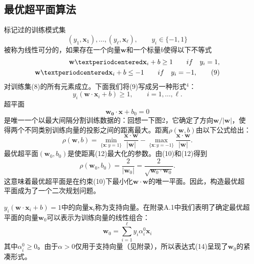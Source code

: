\documentclass[lang=cn,11pt,a4paper]{elegantpaper}
\begin{document}
	\subsection{最优超平面算法}
	标记过的训练模式集
	\begin{equation}
		(y_1,\mathbf{x}_1),\ldots,(y_\ell,\mathbf{x}_\ell),\qquad y_i\in\{-1,1\}\tag{8}
	\end{equation}
	被称为线性可分的，如果存在一个向量$\mathbf{w}$和一个标量$b$使得以下不等式
	\begin{align}
		\mathbf{w}·\mathbf{x}_i+b\geq1\qquad if\quad y_i=1,\notag \\
		\mathbf{w}·\mathbf{x}_i+b\leq-1\qquad if\quad y_i=-1,\tag{9}
	\end{align}
	对训练集(8)的所有元素成立。下面我们将(9)写成另一种形式$^4$：
	\begin{equation}
		y_i(\mathbf{w}·\mathbf{x}_i+b)\geq1,\qquad i=1,\ldots,\ell.\tag{10}
	\end{equation}
	超平面
	\begin{equation}
		\mathbf{w_0·x}+b_0=0\tag{11}
	\end{equation}
	是唯一一个以最大间隔分割训练数据的：回想一下图2，它确定了方向$\mathbf{w}/|\mathbf{w}|$，使得两个不同类别训练向量的投影之间的距离最大。距离$\rho(\mathbf{w},b)$由以下公式给出：
	\begin{equation}
		\rho(\mathbf{w},b)=\min_{\{\mathbf{x}:y=1\}}\frac{\mathbf{x·w}}{|\mathbf{w}|}-\max_{\{\mathbf{x}:y=-1\}}\frac{\mathbf{x·w}}{|\mathbf{w}|}\tag{12}.
	\end{equation}
	最优超平面$(\mathbf{w}_0,b_0)$是使距离(12)最大化的参数。由(10)和(12)得到
	\begin{equation}
		\rho(\mathbf{w}_0,b_0)=\frac{2}{|\mathbf{w}_0|}=\frac{2}{\sqrt{\mathbf{w}_0·\mathbf{w}_0}}.\tag{13}
	\end{equation}
	这意味着最优超平面是在约束(10)下最小化$\mathbf{w·w}$的唯一平面。因此，构造最优超平面成为了一个二次规划问题。

	$y_i(\mathbf{w}·\mathbf{x}_i+b)=1$中的向量$\mathbf{x}_i$称为支持向量。在附录A.1中我们表明了确定最优超平面的向量$\mathbf{w}_0$可以表示为训练向量的线性组合：
	\begin{equation}
		\mathbf{w}_0=\sum_{i=1}^{\ell}{y_i\alpha_i^0\mathbf{x}_i}\tag{14}
	\end{equation}
	其中$\alpha_i^0\geq0$。由于$\alpha>0$仅用于支持向量（见附录），所以表达式(14)呈现了$\mathbf{w}_0$的紧凑形式。
\end{document}
